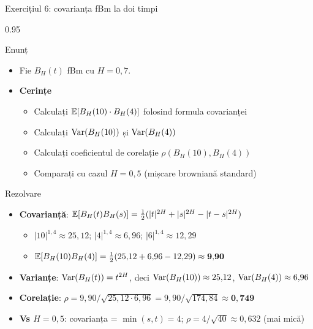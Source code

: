 \documentclass[9pt, aspectratio=169, t]{beamer}
\begin{document}
\begin{frame}[shrink=15]{Exercițiul 6: covarianța fBm la doi timpi}
\begin{cminipage}{0.95\textwidth}
\begin{block}{Enunț}
\begin{itemize}\setlength{\itemsep}{0pt}
    \item Fie $B_H(t)$ fBm cu $H=0{,}7$.
\end{itemize}
\end{block}
\begin{itemize}\setlength{\itemsep}{0pt}
    \item \textbf{Cerințe}
    \begin{itemize}\setlength{\itemsep}{0pt}
        \item Calculați $\mathbb{E}[B_H(10)\cdot B_H(4)]$ folosind formula covarianței
        \item Calculați $\text{Var}(B_H(10))$ și $\text{Var}(B_H(4))$
        \item Calculați coeficientul de corelație $\rho(B_H(10),B_H(4))$
        \item Comparați cu cazul $H=0{,}5$ (mișcare browniană standard)
    \end{itemize}
\end{itemize}
\begin{exampleblock}{Rezolvare}
\begin{itemize}\setlength{\itemsep}{0pt}
    \item \textbf{Covarianță}: $\mathbb{E}[B_H(t)B_H(s)]=\tfrac12(|t|^{2H}+|s|^{2H}-|t-s|^{2H})$
    \begin{itemize}\setlength{\itemsep}{0pt}
        \item $|10|^{1{,}4}\approx 25{,}12$; $|4|^{1{,}4}\approx 6{,}96$; $|6|^{1{,}4}\approx 12{,}29$
        \item $\mathbb{E}[B_H(10)B_H(4)]=\tfrac12(25{,}12+6{,}96-12{,}29)\approx \mathbf{9{,}90}$
    \end{itemize}
    \item \textbf{Varianțe}: $\text{Var}(B_H(t))=t^{2H}$, deci $\text{Var}(B_H(10))\approx 25{,}12$, $\text{Var}(B_H(4))\approx 6{,}96$
    \item \textbf{Corelație}: $\rho=9{,}90/\sqrt{25{,}12\cdot 6{,}96}=9{,}90/\sqrt{174{,}84}\approx \mathbf{0{,}749}$
    \item \textbf{Vs $H=0{,}5$}: covarianța = $\min(s,t)=4$; $\rho=4/\sqrt{40}\approx 0{,}632$ (mai mică)
\end{itemize}
\end{exampleblock}
\end{cminipage}
\end{frame}
\end{document}
